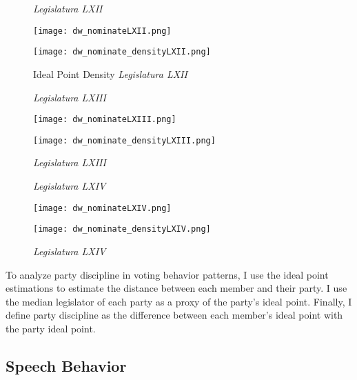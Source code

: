 \documentclass{article}
\begin{document}
\begin{figure}[h!]
	\centering
	\begin{minipage}{.5\textwidth}
		\centering
		\caption{\textit{Legislatura LXII}}
		\texttt{[image: dw\_nominateLXII.png]}
		\label{fig:test1}
	\end{minipage}%
	\begin{minipage}{.5\textwidth}
		\centering
		\caption{Ideal Point Density \textit{Legislatura LXII}}
		\texttt{[image: dw\_nominate\_densityLXII.png]}
		\label{fig:test1}
	\end{minipage}%
\end{figure}

\begin{figure}[!h]
	\centering
	\begin{minipage}{.5\textwidth}
		\centering
		\caption{\textit{Legislatura LXIII}}
		\texttt{[image: dw\_nominateLXIII.png]}
		\label{fig:test1}
	\end{minipage}%
	\begin{minipage}{.5\textwidth}
		\centering
		\caption{\textit{Legislatura LXIII}}
		\texttt{[image: dw\_nominate\_densityLXIII.png]}
		\label{fig:test2}
	\end{minipage}
\end{figure}

\begin{figure}[!h]
	\centering
	\begin{minipage}{.5\textwidth}
		\centering
		\caption{\textit{Legislatura LXIV}}
		\texttt{[image: dw\_nominateLXIV.png]}
		\label{fig:test1}
	\end{minipage}%
	\begin{minipage}{.5\textwidth}
		\centering
		\caption{\textit{Legislatura LXIV}}
		\texttt{[image: dw\_nominate\_densityLXIV.png]}
		\label{fig:test2}
	\end{minipage}
\end{figure}  

To analyze party discipline in voting behavior patterns, I use the ideal point estimations to estimate the distance between each member and their party. I use the median legislator of each party as a proxy of the party's ideal point. Finally, I define party discipline as the difference between each member's ideal point with the party ideal point. 


\newpage
\subsection{Speech  Behavior}
\end{document}
